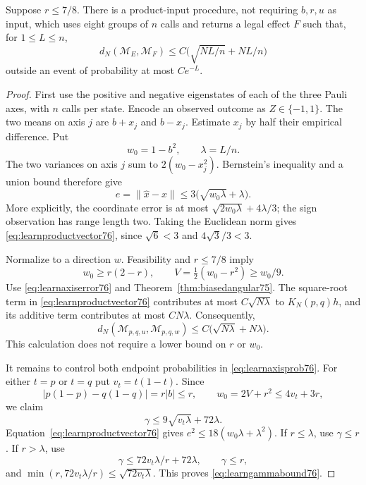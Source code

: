 \begin{lemma}
\label{lem:productlearn76}
Suppose $r\le7/8$.  There is a product-input procedure, not requiring
$b,r,u$ as input, which uses eight groups of $n$ calls and returns a
legal effect $F$ such that, for $1\le L\le n$,
\begin{equation}\label{eq:productlearn76}
 d_N(\mathcal M_E,\mathcal M_F)
       \le C\bigl(\sqrt{NL/n}+NL/n\bigr)
\end{equation}
outside an event of probability at most $Ce^{-L}$.
\end{lemma}
\begin{proof}
First use the positive and negative eigenstates of each of the three
Pauli axes, with $n$ calls per state.  Encode an observed outcome as
$Z\in\{-1,1\}$.  The two means on axis $j$ are
$b+x_j$ and $b-x_j$.  Estimate $x_j$ by half their empirical
difference.  Put
\[
 w_0=1-b^2,\qquad \lambda=L/n.
\]
The two variances on axis $j$ sum to $2(w_0-x_j^2)$.
Bernstein's inequality and a union bound therefore give
\begin{equation}\label{eq:learnproductvector76}
 e=\|\widehat x-x\|
       \le3\bigl(\sqrt{w_0\lambda}+\lambda\bigr).
\end{equation}
More explicitly, the coordinate error is at most
$\sqrt{2w_0\lambda}+4\lambda/3$; the sign observation has range
length two.  Taking the Euclidean norm gives
\eqref{eq:learnproductvector76}, since $\sqrt6<3$ and
$4\sqrt3/3<3$.

Normalize to a direction $w$.  Feasibility and $r\le7/8$ imply
\begin{equation}\label{eq:learnlowvariance76}
 w_0\ge r(2-r),\qquad
 V=\tfrac12(w_0-r^2)\ge w_0/9.
\end{equation}
Use \eqref{eq:learnaxiserror76} and
Theorem~\ref{thm:biasedangular75}.  The square-root term in
\eqref{eq:learnproductvector76} contributes at most
$C\sqrt{N\lambda}$ to $K_N(p,q)h$, and its additive term
contributes at most $CN\lambda$.  Consequently,
\begin{equation}\label{eq:learnlowangle76}
 d_N(\mathcal M_{p,q,u},\mathcal M_{p,q,w})
       \le C\bigl(\sqrt{N\lambda}+N\lambda\bigr).
\end{equation}
This calculation does not require a lower bound on $r$ or $w_0$.

It remains to control both endpoint probabilities in
\eqref{eq:learnaxisprob76}.  For either $t=p$ or $t=q$ put
$v_t=t(1-t)$.  Since
\[
 |p(1-p)-q(1-q)|=r|b|\le r,
 \qquad w_0=2V+r^2\le4v_t+3r,
\]
we claim
\begin{equation}\label{eq:learngammabound76}
 \gamma\le9\sqrt{v_t\lambda}+72\lambda.
\end{equation}
Equation~\eqref{eq:learnproductvector76} gives
$e^2\le18(w_0\lambda+\lambda^2)$.  If $r\le\lambda$, use
$\gamma\le r$.  If $r>\lambda$, use
\[
 \gamma\le72v_t\lambda/r+72\lambda,
 \qquad \gamma\le r,
\]
and $\min(r,72v_t\lambda/r)\le\sqrt{72v_t\lambda}$.
This proves \eqref{eq:learngammabound76}.


\end{proof}

